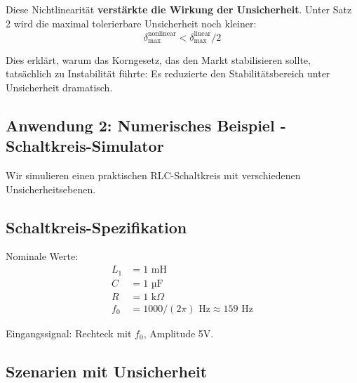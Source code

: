 \documentclass[a4paper, 12pt, twoside, openright]{report}
\theoremstyle{definition}
\theoremstyle{definition}
\begin{document}
Diese Nichtlinearität \textbf{verstärkte die Wirkung der Unsicherheit}. Unter Satz 2 wird die maximal tolerierbare Unsicherheit noch kleiner:
\begin{equation}
\delta_{\max}^{\text{nonlinear}} < \delta_{\max}^{\text{linear}} / 2
\end{equation}

Dies erklärt, warum das Korngesetz, das den Markt stabilisieren sollte, tatsächlich zu Instabilität führte: Es reduzierte den Stabilitätsbereich unter Unsicherheit dramatisch.

\subsection{Anwendung 2: Numerisches Beispiel - Schaltkreis-Simulator}

Wir simulieren einen praktischen RLC-Schaltkreis mit verschiedenen Unsicherheitsebenen.

\subsection{Schaltkreis-Spezifikation}

Nominale Werte:
\begin{align}
L_1 &= 1 \text{ mH} \\
C &= 1 \text{ µF} \\
R &= 1 \text{ k}\Omega \\
f_0 &= 1000/(2\pi) \text{ Hz} \approx 159 \text{ Hz}
\end{align}

Eingangssignal: Rechteck mit $f_0$, Amplitude 5V.

\subsection{Szenarien mit Unsicherheit}
\end{document}
